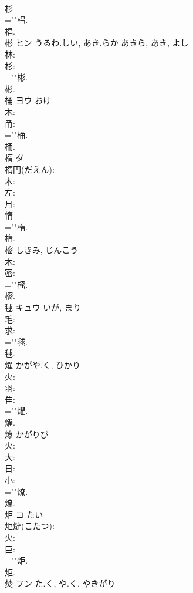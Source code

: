 \documentclass[8pt]{extreport}
\begin{document}
\begin{CJK}{UTF8}{min}
\\	杉 
\\	=""椙.
\\	椙.
\\	彬	ヒン	うるわ.しい, あき.らか	あきら, あき, よし	
\\	林: 
\\	杉: 
\\	=""彬.
\\	彬.
\\	桶	ヨウ	おけ		
\\	木: 
\\	甬: 
\\	=""桶.
\\	桶.
\\	楕	ダ			
\\	楕円(だえん): 
\\	木: 
\\	左: 
\\	月: 
\\	惰 
\\	=""楕.
\\	楕.
\\	樒		しきみ, じんこう				
\\	木: 
\\	密: 
\\	=""樒.
\\	樒.
\\	毬	キュウ	いが, まり		
\\	毛: 
\\	求: 
\\	=""毬.
\\	毬.
\\	燿		かがや.く, ひかり				
\\	火: 
\\	羽: 
\\	隹: 
\\	=""燿.
\\	燿.
\\	燎		かがりび				
\\	火: 
\\	大: 
\\	日: 
\\	小: 
\\	=""燎.
\\	燎.
\\	炬	コ		たい	
\\	炬燵(こたつ): 
\\	火: 
\\	巨: 
\\	=""炬.
\\	炬.
\\	焚	フン	た.く, や.く, やきがり		

\end{CJK}
\end{document}
